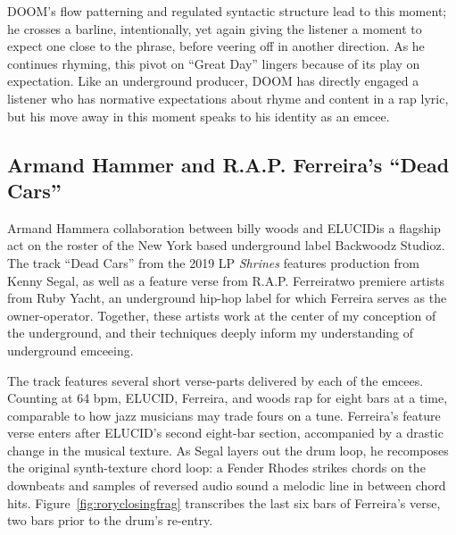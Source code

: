 DOOM's flow patterning and regulated syntactic structure lead to this moment; he crosses a barline, 
intentionally, yet again giving the listener a moment to expect one close to the phrase, before veering
off in another direction. As he continues rhyming, this pivot on ``Great Day'' lingers because of its
play on expectation. Like an underground producer, DOOM has directly engaged a listener who has normative
expectations about rhyme and content in a rap lyric, but his move away in this moment speaks to his
identity as an emcee.

{}
\subsection*{\centering Armand Hammer and R.A.P. Ferreira's ``Dead Cars''}

Armand Hammer\textemdash a collaboration between billy woods and ELUCID\textemdash is a flagship act on
the roster of the New York based underground label Backwoodz Studioz. The track ``Dead Cars'' from the 
2019 LP \textit{Shrines} features production from Kenny Segal, as well as a feature verse from R.A.P. 
Ferreira\textemdash two premiere artists from Ruby Yacht, an underground hip-hop label for which Ferreira
serves as the owner-operator. Together, these artists work at the center of my conception of the underground,
and their techniques deeply inform my understanding of underground emceeing.

The track features several short verse-parts delivered by each of the emcees. Counting at 64 bpm, ELUCID, 
Ferreira, and woods  rap for eight bars at a time, comparable to how jazz musicians may trade fours on a
tune. Ferreira's feature verse enters after ELUCID's second eight-bar section, accompanied by a drastic 
change in the musical texture. As Segal layers out the drum loop, he recomposes the original synth-texture
chord loop: a Fender Rhodes strikes chords on the downbeats and samples of reversed audio sound a melodic 
line in between chord hits. Figure~\ref{fig:roryclosingfrag} transcribes the last six bars of Ferreira's 
verse, two bars prior to the drum's re-entry.

